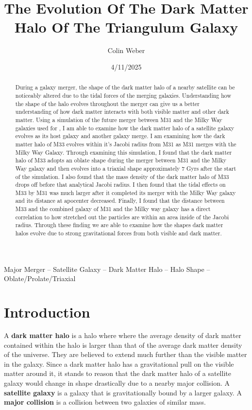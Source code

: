 \documentclass[fleqn,usenatbib]{mnras}
\title{The Evolution Of The Dark Matter Halo Of The Triangulum Galaxy}
\author{Colin Weber}
\date{4/11/2025}
\begin{document}
\label{firstpage}
\pagerange{\pageref{firstpage}--\pageref{lastpage}}
\maketitle
\begin{abstract}
During a galaxy merger, the shape of the dark matter halo of a nearby satellite can be noticeably altered due to the tidal forces of the merging galaxies. Understanding how the shape of the halo evolves throughout the merger can give us a better understanding of how dark matter interacts with both visible matter and other dark matter. Using a simulation of the future merger between M31 and the Milky Way galaxies used for \citet{vanderMarel2012}, I am able to examine how the dark matter halo of a satellite galaxy evolves as its host galaxy and another galaxy merge. I am examining how the dark matter halo of M33 evolves within it's Jacobi radius from M31 as M31 merges with the Milky Way Galaxy. Through examining this simulation, I found that the dark matter halo of M33 adopts an oblate shape during the merger between M31 and the Milky Way galaxy and then evolves into a triaxial shape approximately 7 Gyrs after the start of the simulation. I also found that the mass density of the dark matter halo of M33 drops off before that analytical Jacobi radius. I then found that the tidal effects on M33 by M31 was much larger after it completed its merger with the Milky Way galaxy and its distance at apocenter decreased.
Finally, I found that the distance between M33 and the combined galaxy of M31 and the Milky way galaxy has a direct correlation to how stretched out the particles are within an area inside of the Jacobi radius. Through these finding we are able to examine how the shapes dark matter halos evolve due to strong gravitational forces from both visible and dark matter.

\end{abstract}
\begin{keywords}
Major Merger -- Satellite Galaxy -- Dark Matter Halo -- Halo Shape -- Oblate/Prolate/Triaxial

\end{keywords}
\section{Introduction}
        A \textbf{dark matter halo} is a halo where where the average density of dark matter contained within the halo is larger than that of the average dark matter density of the universe. They are believed to extend much further than the visible matter in the galaxy. Since a dark matter halo has a gravitational pull on the visible matter around it, it stands to reason that the dark matter halo of a satellite galaxy would change in shape drastically due to a nearby major collision. A \textbf{satellite galaxy} is a galaxy that is gravitationally bound by a larger galaxy. A \textbf{major collision} is a collision between two galaxies of similar mass.
\end{document}
